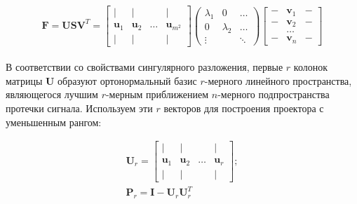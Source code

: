 \begin{equation}
    \mathbf{F} = \mathbf{USV}^T
    =
    \begin{bmatrix}
        |            & |            &        & |       \\
        \mathbf{u}_1 & \mathbf{u}_2 & \dots  & \mathbf{u}_{m^2} \\
        |            & |            &        & |
    \end{bmatrix}
    \begin{pmatrix}
        \lambda_1 & 0         & \dots    \\
        0         & \lambda_2 & \dots    \\
        \vdots    &           & \ddots
    \end{pmatrix}
    \begin{bmatrix}
        - & \mathbf{v}_1 & - \\
        - & \mathbf{v}_2 & - \\
          & \dots        &   \\
        - & \mathbf{v}_n & -
    \end{bmatrix}
    \label{eq:svd_f_fixed_or}
\end{equation}
\\
В соответствии со свойствами сингулярного разложения, первые $r$ колонок матрицы $\mathbf{U}$
образуют ортонормальный базис $r$-мерного линейного пространства,
являющегося лучшим $r$-мерным приближением $n$-мерного
подпространства протечки сигнала. Используем эти $r$ векторов для построения проектора с уменьшенным рангом:

\begin{gather}
    \mathbf{U}_r =
    \begin{bmatrix}
        |            & |            &        & |       \\
        \mathbf{u}_1 & \mathbf{u}_2 & \dots  & \mathbf{u}_r \\
        |            & |            &        & |
    \end{bmatrix}\label{eq:U_fixed_or};\\
    \mathbf{P}_r = \mathbf{I} - \mathbf{U}_r \mathbf{U}_r^T\label{eq:P_fixed_or}
 \end{gather}

